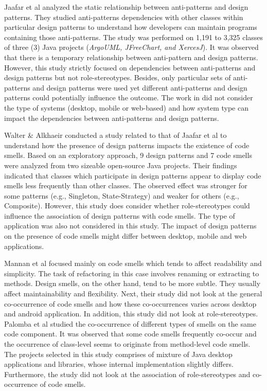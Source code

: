 \documentclass[AMA,Times1COL]{WileyNJDv5} %
\begin{document}
Jaafar et al \cite{jaafar2014analysing} analyzed the static relationship between anti-patterns and design patterns. They studied anti-patterns dependencies with other classes within particular design patterns to understand how developers can maintain programs containing those anti-patterns. The study was performed on 1,191 to 3,325 classes of three (3) Java projects (\textit{ArgoUML, JFreeChart, and XercesJ}). It was observed that there is a temporary relationship between anti-pattern and design patterns. However, this study strictly focused on dependencies between anti-patterns and design patterns but not role-stereotypes. Besides, only particular sets of anti-patterns and design patterns were used yet different anti-patterns and design patterns could potentially influence the outcome. The work in \cite{jaafar2014analysing} did not consider the type of systems (desktop, mobile or web-based) and how system type can impact the dependencies between anti-patterns and design patterns.

Walter \& Alkhaeir \cite{walter2016relationship} conducted a study related to that of Jaafar et al \cite{jaafar2014analysing} to understand how the presence of design patterns impacts the existence of code smells. Based on an exploratory approach, 9 design patterns and 7 code smells were analyzed from two sizeable open-source Java projects. Their findings indicated that classes which participate in design patterns appear to display code smells less frequently than other classes. The observed effect was stronger for some patterns (e.g., Singleton, State-Strategy) and weaker for others (e.g., Composite). However, this study does consider whether role-stereotypes could influence the association of design patterns with code smells. The type of application was also not considered in this study. The impact of design patterns on the presence of code smells might differ between desktop, mobile and web applications.

Mannan et al\cite{mannan2016understanding} focused mainly on code smells which tends to affect readability and simplicity. The task of refactoring in this case involves renaming or extracting to methods. Design smells, on the other hand, tend to be more subtle. They usually affect maintainability and flexibility. Next, their study \cite{mannan2016understanding} did not look at the general co-occurrence of code smells and how these co-occurrences varies across desktop and android application. In addition, this study did not look at role-stereotypes. Palomba et al \cite{palomba2017investigating} studied the co-occurrence of different types of smells on the same code component. It was observed that some code smells frequently co-occur and the occurrence of class-level seems to originate from method-level code smells. The projects selected in this study comprises of mixture of Java desktop applications and libraries, whose internal implementation slightly differs. Furthermore, the study did not look at the association of role-stereotypes and co-occurrence of code smells.
\end{document}
